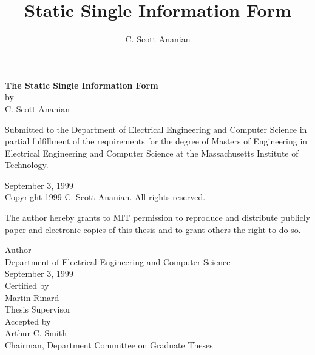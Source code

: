 \documentclass[12pt,titlepage,twoside]{article}
\title{Static Single Information Form}
\author{C. Scott Ananian}
\date{\today \\ \ignore{$ $Revision: 1.118 $ $}}
\begin{document}


\newcommand{\nl}{\\[0.5\baselineskip]}
\newcommand{\tight}{\\[-0.2\baselineskip]}
\begin{titlepage}
\vspace*{0.5cm}
\begin{center}\large
\textbf{\LARGE The Static Single Information Form}\\
by\\
C. Scott Ananian\\
\end{center}
Submitted to the Department of Electrical Engineering and Computer Science
in partial fulfillment of the requirements for the degree of
Masters of Engineering in Electrical Engineering and Computer Science
at the Massachusetts Institute of Technology.
\begin{center}
September 3, 1999\nl
Copyright 1999 C. Scott Ananian.  All rights reserved.\nl
\end{center}

\begin{flushleft}
The author hereby grants to MIT permission to reproduce and distribute
publicly paper and electronic copies of this thesis and to grant
others the right to do so.
\end{flushleft}

\vspace{0.5cm}
\begin{flushright}
Author\hrulefill\tight
\hfill Department of Electrical Engineering and Computer Science\tight
\hfill September 3, 1999\nl
Certified by\hrulefill\tight
\hfill Martin Rinard\tight
\hfill Thesis Supervisor\nl
Accepted by\hrulefill\\
\hfill Arthur C. Smith\tight
\hfill Chairman, Department Committee on Graduate Theses\nl
\end{flushright}
\end{titlepage}\setcounter{page}{2}
\end{document}
